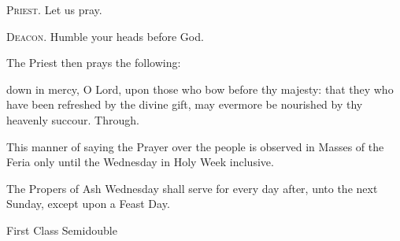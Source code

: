 \textsc{Priest.} Let us pray.\par
\textsc{Deacon.} Humble your heads before God.\par
\begin{rubric}
    The Priest then prays the following:
\end{rubric}
 down in mercy, O Lord, upon those who bow before thy majesty: that they who have been refreshed by the divine gift, may evermore be nourished by thy heavenly succour. Through.
\begin{rubric}
This manner of saying the Prayer over the people is observed in Masses of the Feria only until the Wednesday in Holy Week inclusive.
\end{rubric}
\begin{rubric}
    The Propers of Ash Wednesday shall serve for every day after, unto the next Sunday, except upon a Feast Day.
\end{rubric}

\begin{inhead}
{First Class Semidouble}
\end{inhead}

\properantiphonfix

